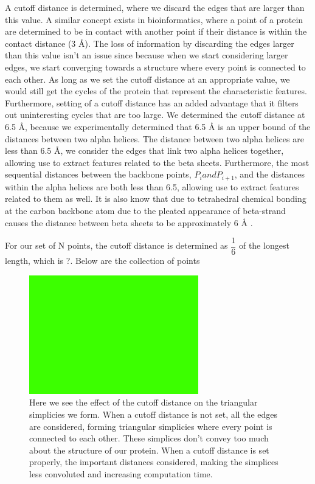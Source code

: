 \documentclass[12pt, a4paper, twocolumn, fullpage]{article}
\theoremstyle{plain}
\theoremstyle{definition}
\theoremstyle{remark}
\begin{document}
A cutoff distance is determined, where we discard the edges that are larger than this value. A similar concept exists in bioinformatics, where a point of a protein are determined to be in contact with another point if their distance is within the contact distance (3 Å). The loss of information by discarding the edges larger than this value isn't an issue since because when we start considering larger edges, we start converging towards a structure where every point is connected to each other. As long as we set the cutoff distance at an appropriate value, we would still get the cycles of the protein that represent the characteristic features. Furthermore, setting of a cutoff distance has an added advantage that it filters out uninteresting cycles that are too large. We determined the cutoff distance at 6.5 Å, because we experimentally determined that 6.5 Å is an upper bound of the distances between two alpha helices. The distance between two alpha helices are less than 6.5  Å, we  consider the edges that link two alpha helices together, allowing use to extract features related to the beta sheets. Furthermore, the most sequential distances between the backbone points, $P_i and P_{i+1}$, and the distances within the alpha helices are both less than 6.5, allowing use to extract features related to them as well. It is also know that due to   tetrahedral chemical bonding at the carbon backbone atom due to the pleated appearance of beta-strand causes the distance between beta sheets to be approximately 6 Å \cite{fastSCOP}.

For our set of N points, the cutoff distance is determined as $\dfrac{1}{6}$ of the longest length, which is ?. Below are the collection of points 

\begin{figure}[t]
    \includegraphics[width=\linewidth]{img/blank.png}
    \caption{Here we see the effect of the cutoff distance on the triangular simplicies we form. When a cutoff distance is not set, all the edges are considered, forming triangular simplicies where every point is connected to each other. These simplices don't convey too much about the structure of our protein. When a cutoff distance is set properly, the important distances considered, making the simplices less convoluted and increasing computation time.}
    \label{Effect of cutoff}
\end{figure}
\end{document}
